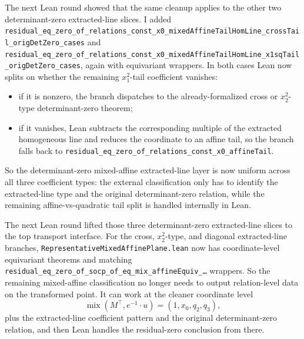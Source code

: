 \documentclass[11pt]{article}
\begin{document}
The next Lean round showed that the same cleanup applies to the other two
determinant-zero extracted-line slices. I added
\texttt{residual\_eq\_zero\_of\_relations\_const\_x0\_mixedAffineTailHomLine\_crossTail\_origDetZero\_cases}
and
\texttt{residual\_eq\_zero\_of\_relations\_const\_x0\_mixedAffineTailHomLine\_x1sqTail\_origDetZero\_cases},
again with equivariant wrappers. In both cases Lean now splits on whether the
remaining \(x_1^2\)-tail coefficient vanishes:
\begin{itemize}
\item if it is nonzero, the branch dispatches to the already-formalized cross
or \(x_2^2\)-type determinant-zero theorem;
\item if it vanishes, Lean subtracts the corresponding multiple of the
extracted homogeneous line and reduces the coordinate to an affine tail, so the
branch falls back to
\texttt{residual\_eq\_zero\_of\_relations\_const\_x0\_affineTail}.
\end{itemize}
So the determinant-zero mixed-affine extracted-line layer is now uniform across
all three coefficient types: the external classification only has to identify
the extracted-line type and the original determinant-zero relation, while the
remaining affine-vs-quadratic tail split is handled internally in Lean.

The next Lean round lifted those three determinant-zero extracted-line slices
to the top transport interface. For the cross, \(x_2^2\)-type, and diagonal
extracted-line branches, \texttt{RepresentativeMixedAffinePlane.lean} now has
coordinate-level equivariant theorems and matching
\texttt{residual\_eq\_zero\_of\_socp\_of\_eq\_mix\_affineEquiv\_\dots} wrappers.
So the remaining mixed-affine classification no longer needs to output
relation-level data on the transformed point. It can work at the cleaner
coordinate level
\[
  \operatorname{mix}(M^\top, e^{-1}\!\cdot u) = (1,x_0,q_2,q_3),
\]
plus the extracted-line coefficient pattern and the original determinant-zero
relation, and then Lean handles the residual-zero conclusion from there.
\end{document}
